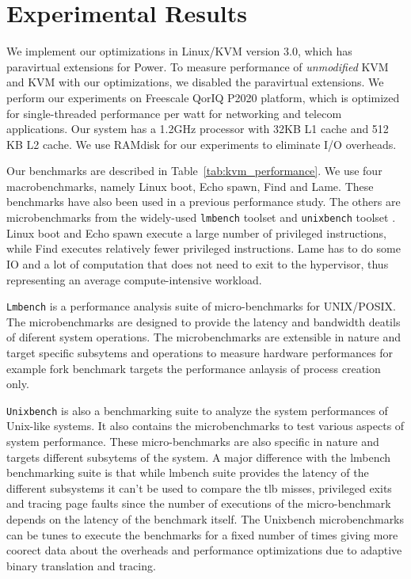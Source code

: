 \chapter{Experimental Results}\label{ch:6}
We implement our optimizations in Linux/KVM version 3.0, which has paravirtual extensions for Power. To measure performance of {\em unmodified} KVM and KVM with our optimizations, we disabled the paravirtual extensions. We perform our experiments on Freescale QorIQ P2020 platform, which is optimized for single-threaded performance per watt for networking and telecom applications. Our system has a 1.2GHz processor with 32KB L1 cache and 512 KB L2 cache. We use RAMdisk for our experiments to eliminate I/O overheads.

Our benchmarks are described in Table~\ref{tab:kvm_performance}. We use four macrobenchmarks, namely Linux boot, Echo spawn, Find and Lame. These benchmarks have also been used in a previous performance study\cite{kvm_ppc_exittimings}. The others are microbenchmarks from the widely-used {\tt lmbench} toolset\cite{lmbench} and {\tt unixbench} toolset \cite{unixbench}. Linux boot and Echo spawn execute a large number of privileged instructions, while Find executes relatively fewer privileged instructions. Lame has to do some IO and a lot of computation that does not need to exit to the hypervisor, thus representing an average compute-intensive workload. 

{\tt Lmbench} is a performance analysis suite of micro-benchmarks for UNIX/POSIX. The microbenchmarks are designed to provide the latency and bandwidth deatils of diferent system operations. The microbenchmarks are extensible in nature and target specific subsytems and operations to measure hardware performances for example fork benchmark targets the performance anlaysis of process creation only.

{\tt Unixbench} is also a benchmarking suite to analyze the system performances of Unix-like systems. It also contains the microbenchmarks to test various aspects of system performance. These micro-benchmarks are also specific in nature and targets different subsytems of the system. A major difference with the lmbench benchmarking suite is that while lmbench suite provides the latency of the different subsystems it can't be used to compare the tlb misses, privileged exits and tracing page faults since the number of executions of the micro-benchmark depends on the latency of the benchmark itself. The Unixbench microbenchmarks can be tunes to execute the benchmarks for a fixed number of times giving more coorect data about the overheads and performance optimizations due to adaptive binary translation and tracing.


